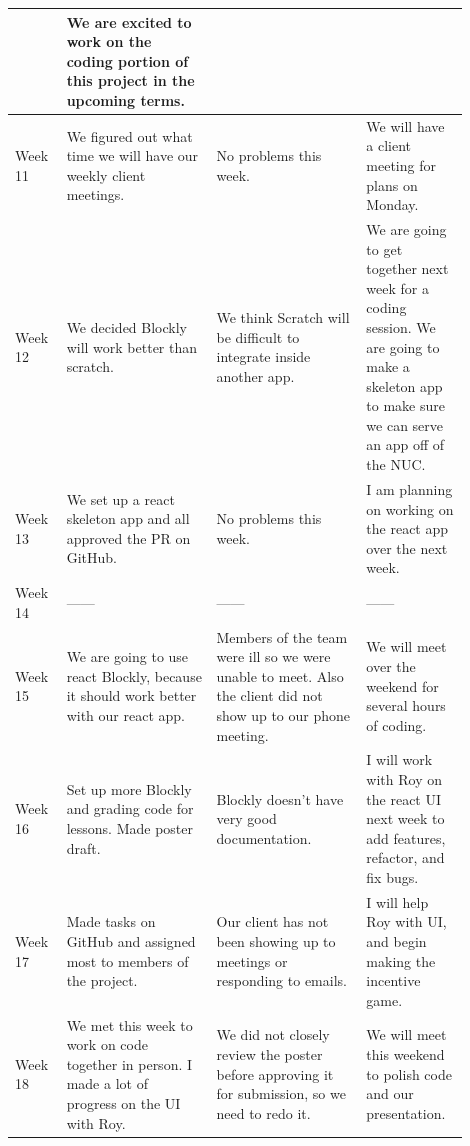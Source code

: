 \documentclass[draftclsnofoot,10pt,onecolumn]{IEEEtran}
\begin{document}
\begin{longtable}{p{0.1\linewidth}p{0.3\linewidth}p{0.3\linewidth}p{0.2\linewidth}}
             & We are excited to work on the coding portion of this project in the upcoming terms.\\
            \hline
            Week 11
             & We figured out what time we will have our weekly client meetings.
             & No problems this week.
             & We will have a client meeting for plans on Monday. \\
            \hline
            Week 12
             & We decided Blockly will work better than scratch.
             & We think Scratch will be difficult to integrate inside another app.
             & We are going to get together next week for a coding session. We are going to make a skeleton app to make sure we can serve an app off of the NUC.\\
            \hline
            Week 13
             & We set up a react skeleton app and all approved the PR on GitHub.
             & No problems this week.
             & I am planning on working on the react app over the next week.\\
            \hline
            Week 14
             & ------
             & ------
             & ------\\
            \hline
            Week 15
             & We are going to use react Blockly, because it should work better with our react app.
             & Members of the team were ill so we were unable to meet. Also the client did not show up to our phone meeting.
             & We will meet over the weekend for several hours of coding.\\
            \hline
            Week 16
             & Set up more Blockly and grading code for lessons. Made poster draft.
             & Blockly doesn't have very good documentation.
             & I will work with Roy on the react UI next week to add features, refactor, and fix bugs.\\
            \hline
            Week 17
             & Made tasks on GitHub and assigned most to members of the project.
             & Our client has not been showing up to meetings or responding to emails.
             & I will help Roy with UI, and begin making the incentive game.\\
            \hline
            Week 18
             & We met this week to work on code together in person. I made a lot of progress on the UI with Roy.
             & We did not closely review the poster before approving it for submission, so we need to redo it.
             & We will meet this weekend to polish code and our presentation.\\

\end{longtable}
\end{document}
